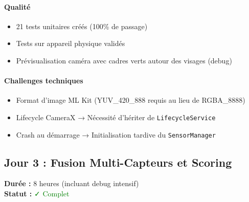 \documentclass[11pt,a4paper]{article}
\begin{document}
\paragraph{Qualité}
\begin{itemize}
    \item 21 tests unitaires créés (100\% de passage)
    \item Tests sur appareil physique validés
    \item Prévisualisation caméra avec cadres verts autour des visages (debug)
\end{itemize}

\paragraph{Challenges techniques}
\begin{itemize}
    \item Format d'image ML Kit (YUV\_420\_888 requis au lieu de RGBA\_8888)
    \item Lifecycle CameraX → Nécessité d'hériter de \texttt{LifecycleService}
    \item Crash au démarrage → Initialisation tardive du \texttt{SensorManager}
\end{itemize}

\subsection{Jour 3 : Fusion Multi-Capteurs et Scoring}

\textbf{Durée :} 8 heures (incluant debug intensif) \\
\textbf{Statut :} \textcolor{green}{✓ Complet}
\end{document}
